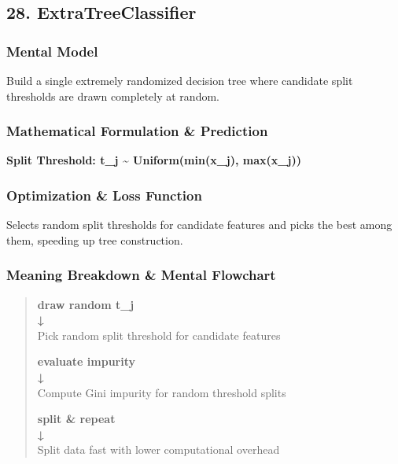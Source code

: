 \documentclass[
  10pt,
  letterpaper,
]{article}
\begin{document}
\hypertarget{extratreeclassifier}{%
\subsection{28. ExtraTreeClassifier}\label{extratreeclassifier}}

\hypertarget{mental-model-27}{%
\subsubsection{Mental Model}\label{mental-model-27}}

Build a single extremely randomized decision tree where candidate split thresholds are drawn completely at random.

\hypertarget{mathematical-formulation-prediction-27}{%
\subsubsection{Mathematical Formulation \& Prediction}\label{mathematical-formulation-prediction-27}}

\textbf{Split Threshold: t\_j \textasciitilde{} Uniform(min(x\_j), max(x\_j))}

\hypertarget{optimization-loss-function-27}{%
\subsubsection{Optimization \& Loss Function}\label{optimization-loss-function-27}}

Selects random split thresholds for candidate features and picks the best among them, speeding up tree construction.

\hypertarget{meaning-breakdown-mental-flowchart-27}{%
\subsubsection{Meaning Breakdown \& Mental Flowchart}\label{meaning-breakdown-mental-flowchart-27}}

\begin{quote}
\textbf{draw random t\_j\\
↓\\
}Pick random split threshold for candidate features

\textbf{evaluate impurity\\
↓\\
}Compute Gini impurity for random threshold splits

\textbf{split \& repeat\\
↓\\
}Split data fast with lower computational overhead
\end{quote}
\end{document}
